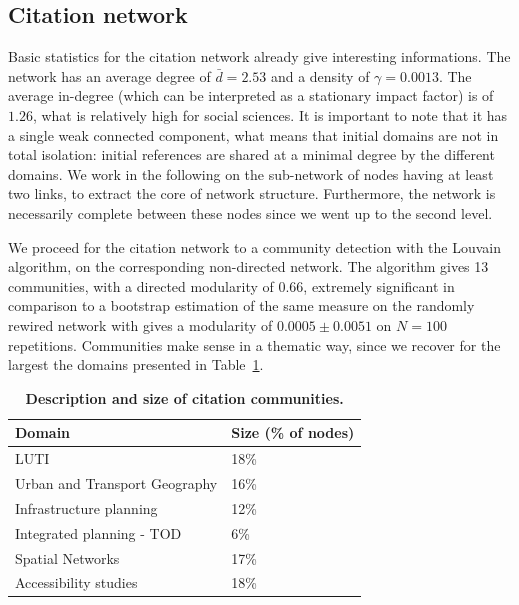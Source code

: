 \documentclass[10pt]{article}
\begin{document}
\subsection{Citation network}

Basic statistics for the citation network already give interesting informations. The network has an average degree of $\bar{d}=2.53$ and a density of $\gamma=0.0013$. The average in-degree (which can be interpreted as a stationary impact factor) is of $1.26$, what is relatively high for social sciences. It is important to note that it has a single weak connected component, what means that initial domains are not in total isolation: initial references are shared at a minimal degree by the different domains. We work in the following on the sub-network of nodes having at least two links, to extract the core of network structure. Furthermore, the network is necessarily complete between these nodes since we went up to the second level.

We proceed for the citation network to a community detection with the Louvain algorithm, on the corresponding non-directed network. The algorithm gives 13 communities, with a directed modularity of 0.66, extremely significant in comparison to a bootstrap estimation of the same measure on the randomly rewired network with gives a modularity of $0.0005 \pm 0.0051$ on $N=100$ repetitions. Communities make sense in a thematic way, since we recover for the largest the domains presented in Table~\ref{tab:citation}.

\begin{table}
\caption{\textbf{Description and size of citation communities.}\label{tab:citation}}
\begin{center}
\begin{tabular}{|l|l|}
\hline
	Domain & Size (\% of nodes)\\\hline
	LUTI & 18\% \\\hline
	Urban and Transport Geography & 16\% \\\hline
	Infrastructure planning & 12\% \\\hline
	Integrated planning - TOD & 6\% \\\hline
	Spatial Networks & 17\% \\\hline
	Accessibility studies & 18\% \\\hline
\end{tabular}
\end{center}
\end{table}
\end{document}
